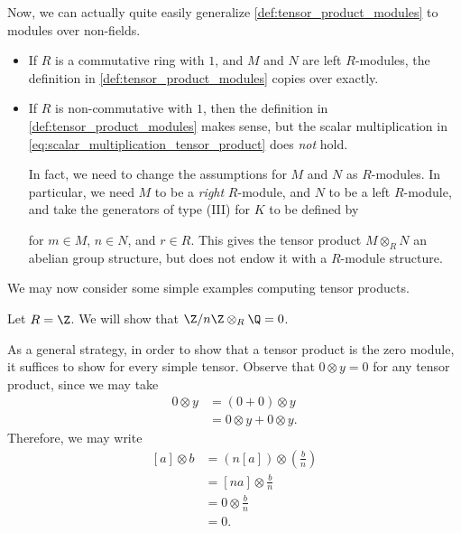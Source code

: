 \documentclass[10pt]{mypackage}
\begin{document}
Now, we can actually quite easily generalize \eqref{def:tensor_product_modules} to modules over non-fields.
\begin{itemize}
  \item If $R$ is a commutative ring with $1$, and $M$ and $N$ are left $R$-modules, the definition in \eqref{def:tensor_product_modules} copies over exactly.
  \item If $R$ is non-commutative with $1$, then the definition in \eqref{def:tensor_product_modules} makes sense, but the scalar multiplication in \eqref{eq:scalar_multiplication_tensor_product} does \textit{not} hold.

    In fact, we need to change the assumptions for $M$ and $N$ as $R$-modules. In particular, we need $M$ to be a \textit{right} $R$-module, and $N$ to be a left $R$-module, and take the generators of type (III) for $K$ to be defined by
    for $m\in M$, $n\in N$, and $r\in R$. This gives the tensor product $M\otimes_{R}N$ an abelian group structure, but does not endow it with a $R$-module structure.
\end{itemize}
We may now consider some simple examples computing tensor products.
\begin{example}
  Let $R = \Z$. We will show that $\Z/n\Z\otimes_{R}\Q = 0$.

  As a general strategy, in order to show that a tensor product is the zero module, it suffices to show for every simple tensor. Observe that $0\otimes y = 0$ for any tensor product, since we may take
  \begin{align*}
    0\otimes y &= \left( 0 + 0 \right)\otimes y\\
               &= 0\otimes y + 0\otimes y.
  \end{align*}
  Therefore, we may write
  \begin{align*}
    \left[ a \right]\otimes b &= \left( n\left[ a \right] \right)\otimes \left( \frac{b}{n} \right)\\
                              &= \left[ na \right]\otimes \frac{b}{n}\\
                              &= 0\otimes \frac{b}{n}\\
                              &= 0.
  \end{align*}
\end{example}
\end{document}

